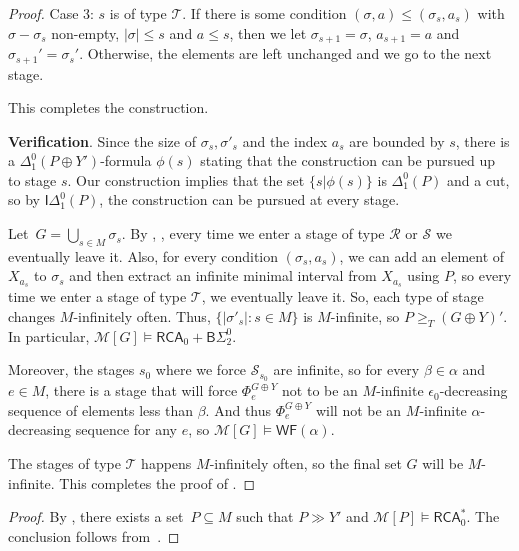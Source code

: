 \documentclass{article}
\numberwithin{theorem}{section}
\newtheorem{corollary}[theorem]{Corollary}
\newcommand{\RCA}{\mathsf{RCA}}
\newcommand{\BSig}{\mathsf{B}\Sigma^0}
\newcommand{\IDel}{\mathsf{I}\Delta^0}
\newcommand{\WF}{\mathsf{WF}}
\newcommand{\R}{\mathcal{R}}
\renewcommand{\S}{\mathcal{S}}
\newcommand{\T}{\mathcal{T}}
\newcommand{\M}{\mathcal{M}}
\begin{document}
\begin{proof}
Case 3: $s$ is of type $\mathcal{T}$. If there is some condition $(\sigma,a) \leq (\sigma_s,a_s)$ with $\sigma - \sigma_s$ non-empty, $|\sigma| \leq s$ and $a \leq s$, then we let $\sigma_{s+1} = \sigma$, $a_{s+1} = a$ and $\sigma_{s+1}' = \sigma_s'$. Otherwise, the elements are left unchanged and we go to the next stage.

This completes the construction.
\bigskip

\textbf{Verification}. Since the size of $\sigma_s, \sigma'_s$ and the index $a_s$ are bounded by $s$, there is a $\Delta_1^0(P \oplus Y')$-formula $\phi(s)$ stating that the construction can be pursued up to stage $s$. Our construction implies that the set $\{s|\phi(s)\}$ is $\Delta^0_1(P)$ and a cut, so by $\IDel_1(P)$, the construction can be pursued at every stage.

Let~$G = \bigcup_{s \in M} \sigma_s$.
By , , every time we enter a stage of type $\R$ or $\S$ we eventually leave it. Also, for every condition $(\sigma_s, a_s)$, we can add an element of $X_{a_s}$ to $\sigma_s$ and then extract an infinite minimal interval from $X_{a_s}$ using $P$, so every time we enter a stage of type $\T$, we eventually leave it. So, each type of stage changes $M$-infinitely often. Thus, $\{|\sigma'_s| : s \in M \}$ is $M$-infinite, so $P \geq_T (G \oplus Y)'$. In particular, $\M[G] \models \RCA_0 + \BSig_2$. 

Moreover, the stages $s_0$ where we force $\S_{s_0}$ are infinite, so for every $\beta \in \alpha$ and $e \in M$, there is a stage that will force $\Phi^{G \oplus Y}_e$ not to be an $M$-infinite $\epsilon_0$-decreasing sequence of elements less than $\beta$. And thus $\Phi^{G \oplus Y}_e$ will not be an $M$-infinite $\alpha$-decreasing sequence for any $e$, so $\M[G] \models \WF(\alpha)$.

The stages of type $\T$ happens $M$-infinitely often, so the final set $G$ will be $M$-infinite. This completes the proof of .

\end{proof}

\begin{proof}
By , there exists a set~$P \subseteq M$ such that $P \gg Y'$ and $\M[P] \models \RCA_0^*$.
The conclusion follows from~.
\end{proof}
\end{document}
